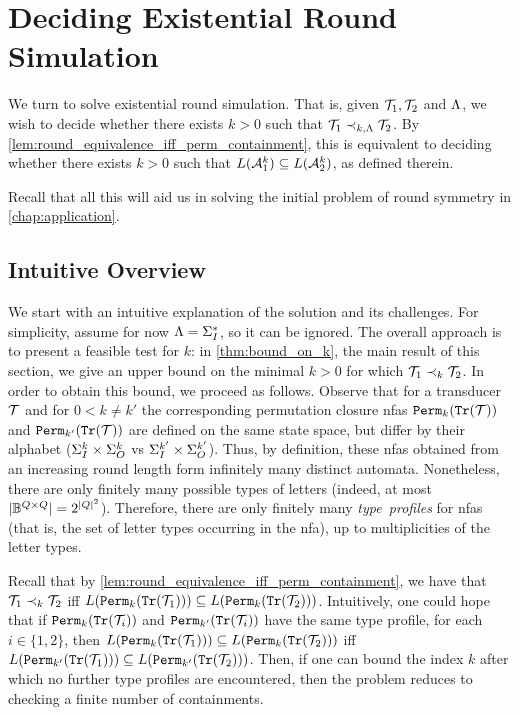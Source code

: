 \chapter{Deciding Existential Round Simulation}
\label{chap:deciding_existential_round_sim}

We turn to solve existential round simulation. That is, given $\mathcal{T}_1,\mathcal{T}_2$ and $\Lambda$, we wish to decide whether there exists $k>0$ such that $\mathcal{T}_1\prec_{k,\Lambda} \mathcal{T}_2$. 
By \autoref{lem:round_equivalence_iff_perm_containment}, this is equivalent to deciding whether there exists $k>0$ such that $L(\mathcal{A}^k_1)\subseteq L(\mathcal{A}^k_2)$, as defined therein.

Recall that all this will aid us in solving the initial problem of round symmetry in \autoref{chap:application}.

\section{Intuitive Overview}
\label{sec:intuitive_overview}
We start with an intuitive explanation of the solution and its challenges. For simplicity, assume for now $\Lambda=\Sigma_{I}^*$, so it can be ignored. The overall approach is to present a feasible test for $k$: in \autoref{thm:bound_on_k}, the main result of this section, we give an upper bound on the minimal $k>0$ for which $\mathcal{T}_1\prec_{k} \mathcal{T}_2$. In order to obtain this bound, we proceed as follows. Observe that for a transducer $\mathcal{T}$ and for $0<k\neq k'$ the corresponding permutation closure \glspl{nfa} ${\mathtt{Perm}}_k({\mathtt{Tr}}(\mathcal{T}))$ and ${\mathtt{Perm}}_{k'}({\mathtt{Tr}}(\mathcal{T}))$ are defined on the same state space, but differ by their alphabet ($\Sigma_{I}^{k}\times \Sigma_{O}^{k}$ vs $\Sigma_{I}^{k'}\times \Sigma_{O}^{k'}$). Thus, by definition, these \glspl{nfa} obtained from an increasing round length form infinitely many distinct automata. Nonetheless, there are only finitely many possible types of letters (indeed, at most $|\mathbb{B}^{Q\times Q}|=2^{|Q|^2}$). Therefore, there are only finitely many \emph{type~profiles} for \glspl{nfa} (that is, the set of letter types occurring in the \gls{nfa}), up to multiplicities of the letter types.

Recall that by \autoref{lem:round_equivalence_iff_perm_containment}, we have that $\mathcal{T}_1\prec_k \mathcal{T}_2$ iff $L({\mathtt{Perm}}_k({\mathtt{Tr}}(\mathcal{T}_1)))\subseteq L({\mathtt{Perm}}_{k}({\mathtt{Tr}}(\mathcal{T}_2)))$.
Intuitively, one could hope that if ${\mathtt{Perm}}_k({\mathtt{Tr}}(\mathcal{T}_i))$ and ${\mathtt{Perm}}_{k'}({\mathtt{Tr}}(\mathcal{T}_i))$ have the same type profile, for each $i\in \{1,2\}$, then $L({\mathtt{Perm}}_k({\mathtt{Tr}}(\mathcal{T}_1)))\subseteq L({\mathtt{Perm}}_{k}({\mathtt{Tr}}(\mathcal{T}_2)))$ iff $L({\mathtt{Perm}}_{k'}({\mathtt{Tr}}(\mathcal{T}_1)))\subseteq L({\mathtt{Perm}}_{k'}({\mathtt{Tr}}(\mathcal{T}_2)))$. Then, if one can bound the index $k$ after which no further type profiles are encountered, then the problem reduces to checking a finite number of containments.

